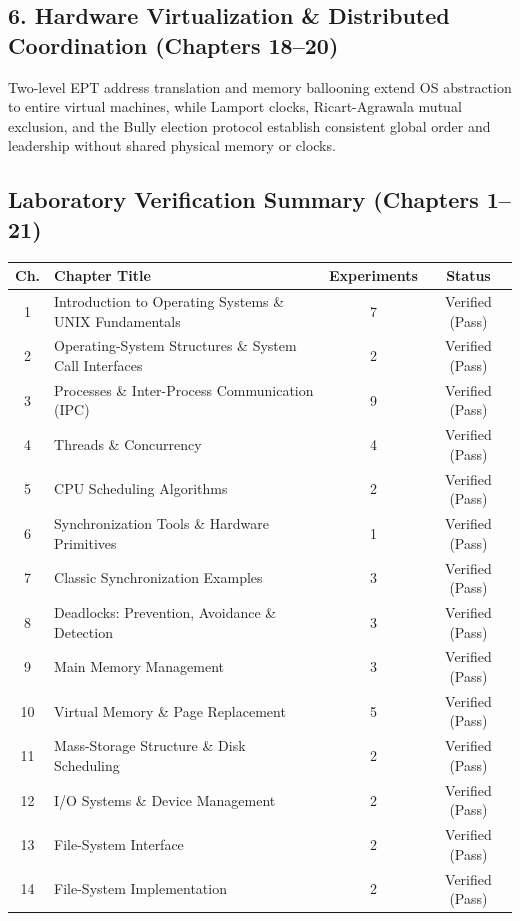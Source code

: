 \documentclass[11pt,a4paper]{report}
\begin{document}
\subsection*{6. Hardware Virtualization \& Distributed Coordination (Chapters 18--20)}
Two-level EPT address translation and memory ballooning extend OS abstraction to entire virtual machines, while Lamport clocks, Ricart-Agrawala mutual exclusion, and the Bully election protocol establish consistent global order and leadership without shared physical memory or clocks.\par
\vspace{10pt}\subsection*{Laboratory Verification Summary (Chapters 1--21)}
\begin{center}
\small
\begin{tabular}{@{}clcc@{}}
\toprule
\textbf{Ch.} & \textbf{Chapter Title} & \textbf{Experiments} & \textbf{Status} \\
\midrule
1 & Introduction to Operating Systems \& UNIX Fundamentals & 7 & Verified (Pass) \\
2 & Operating-System Structures \& System Call Interfaces & 2 & Verified (Pass) \\
3 & Processes \& Inter-Process Communication (IPC) & 9 & Verified (Pass) \\
4 & Threads \& Concurrency & 4 & Verified (Pass) \\
5 & CPU Scheduling Algorithms & 2 & Verified (Pass) \\
6 & Synchronization Tools \& Hardware Primitives & 1 & Verified (Pass) \\
7 & Classic Synchronization Examples & 3 & Verified (Pass) \\
8 & Deadlocks: Prevention, Avoidance \& Detection & 3 & Verified (Pass) \\
9 & Main Memory Management & 3 & Verified (Pass) \\
10 & Virtual Memory \& Page Replacement & 5 & Verified (Pass) \\
11 & Mass-Storage Structure \& Disk Scheduling & 2 & Verified (Pass) \\
12 & I/O Systems \& Device Management & 2 & Verified (Pass) \\
13 & File-System Interface & 2 & Verified (Pass) \\
14 & File-System Implementation & 2 & Verified (Pass) \\

\end{tabular}
\end{center}
\end{document}
